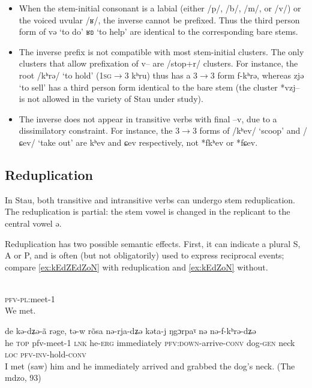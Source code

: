 \documentclass[oldfontcommands,oneside,a4paper,11pt]{article}
\newcommand{\ipa}[1]{{\phon #1}} %
\begin{document}
\begin{itemize}
\item When the stem-initial consonant is a labial (either /p/, /b/, /m/, or  /v/) or the voiced uvular /ʁ/, the inverse cannot be prefixed. Thus the third person form of \ipa{və} `to do' \ipa{ʁʚ} `to help' are identical to the corresponding bare stems.
\item The inverse prefix is not compatible with most stem-initial clusters. The only clusters that allow prefixation of \ipa{v}-- are /stop+\ipa{r}/ clusters. For instance, the root /kʰrə/ `to hold' (\textsc{1sg$\rightarrow$3} \ipa{kʰru}) thus has a 3$\rightarrow$3 form \ipa{f-kʰrə}, whereas \ipa{zjə} `to sell' has a third person form identical to the bare stem (the cluster *\ipa{vzj}-- is not allowed in the variety of Stau under study).
\item The inverse does not appear in transitive verbs with final \ipa{--v}, due to a dissimilatory constraint. For instance, the 3$\rightarrow$3 forms of /\ipa{kʰev}/ `scoop' and /\ipa{ɕev}/ `take out' are \ipa{kʰev} and \ipa{ɕev} respectively, not *\ipa{fkʰev} or *\ipa{fɕev}.
\end{itemize}

\subsection{Reduplication}
In Stau, both transitive and intransitive verbs can undergo stem reduplication. The reduplication is partial: the stem vowel is changed in the replicant to the central vowel \ipa{ə}. 

Reduplication has two possible semantic effects. First, it can indicate a plural S, A or P, and is often (but not obligatorily) used to express reciprocal events; compare  \ref{ex:kEdZEdZoN} with  reduplication and \ref{ex:kEdZoN} without.

\begin{exe}
\ex \label{ex:kEdZEdZoN}
\gll \ipa{kə-dʑədʑə-ã} \\
\textsc{pfv-pl}:meet-1 \\
\glt We met.
\end{exe}

\begin{exe}
\ex \label{ex:kEdZoN}
\gll  \ipa{tə} 	\ipa{de} 	\ipa{kə-dʑə-ã} 	\ipa{rəge,} 	\ipa{tə-w} 	\ipa{rõsa} 	\ipa{nə-rja-dʑə} 	\ipa{kəta-j} 	\ipa{ŋgɔrpaˠ} 	\ipa{nə} 	\ipa{nə-f-kʰrə-dʑə} \\
he \textsc{top} pfv-meet-1 \textsc{lnk} he-\textsc{erg} immediately \textsc{pfv:down}-arrive-\textsc{conv} dog-\textsc{gen}  neck \textsc{loc} \textsc{pfv-inv}-hold-\textsc{conv} \\
\glt I met (saw) him and he immediately arrived and grabbed the dog's neck. (The mdzo, 93)
\end{exe}
\end{document}
